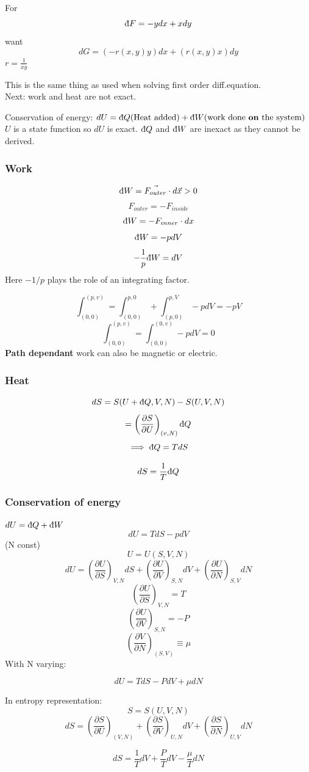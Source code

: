 \documentclass[11pt]{book}
\theoremstyle{definition}
\begin{document}
For \[ \text{\dj} F = -ydx+xdy \]
want 
\[ dG = (-r(x,y)y)dx + (r(x,y)x) dy\] 
$ r = \frac{1}{xy} $ 

This is the same thing as used when solving first order diff.equation. \\

Next: work and heat are not exact. 

Conservation of energy:
$ dU = \text{\dj} Q \text{(Heat added)} + \text{\dj} W \text{(work done \textbf{on} the system)}$
$ U $  is a state function so $ dU $ is exact.
$ \text{\dj} Q $ and $ \text{\dj} W $ are inexact as they cannot be derived.   

\subsubsection{Work}%
\label{ssub:Work}

\begin{equation}
	\text{\dj} W = \vec{F_{outer}} \cdot d \vec{x} > 0
\end{equation}
\[ F_{outer} = - F_{inside} \] 
\[ \text{\dj} W = -F_{inner} \cdot dx \] 
\[ \text{\dj} W = -pdV \] 
\[ -\frac{1}{p} \text{\dj} W = dV \] 
Here $ -1/p $ plays the role of an integrating factor.

\[ \int_{(0,0)}^{(p,v)} = \int_{(0,0)}^{p,0} + \int_{(p,0)}^{p,V} -p dV = -pV\] 
\[ \int_{(0,0)}^{(p,v)} = \int_{(0,0)}^{(0,v)} -pdV = 0   \] 
\textbf{Path dependant} 
work can also be magnetic or electric.
\subsubsection{Heat}%
\[ dS = S(U+\text{\dj} Q, V, N) - S(U,V,N) \] 
\[ = \left( \frac{\partial S}{\partial U} \right)_{(v,N)} \text{\dj} Q  \] 
\[ \implies \text{\dj} Q = T dS \] 

\[ dS = \frac{1}{T} \text{\dj} Q \] 

\subsubsection{Conservation of energy}%
\label{ssub:Conservationofenergy}
$ dU = \text{\dj} Q + \text{\dj} W $ 
\[ dU = T dS - pdV \] (N const)
\[ U = U(S,V,N) \] 
\[ dU = \left ( \frac{\partial U}{\partial S}\right )_{V,N} dS + \left ( \frac{\partial U}{\partial V}\right )_{S,N} dV + \left( \frac{\partial U}{\partial N}\right )_{S,V} dN \] 
\[ \left(\frac{\partial U}{\partial S}\right)_{V,N} = T \] 
\[ \left(\frac{\partial U}{\partial V}\right)_{S,N} = -P \] 
\[ \left(\frac{\partial V}{\partial N}\right)_{(S,V)} \equiv \mu \] 
With N varying:
\begin{shaded*}
\[ dU = TdS - PdV + \mu dN \] 
\end{shaded*}
In entropy representation:
	\[ S = S(U,V,N) \] 
	\[ dS = \left(\frac{\partial S}{\partial U}\right)_{(V,N)} + \left(\frac{\partial S}{\partial V}\right)_{U,N} dV +
	\left(\frac{\partial S}{\partial N}\right)_{U,V} dN\] 	
\begin{shaded*}
	\[ dS = \frac{1}{T} dV + \frac{P}{T}dV - \frac{\mu}{T}dN \] 
\end{shaded*}
\end{document}
